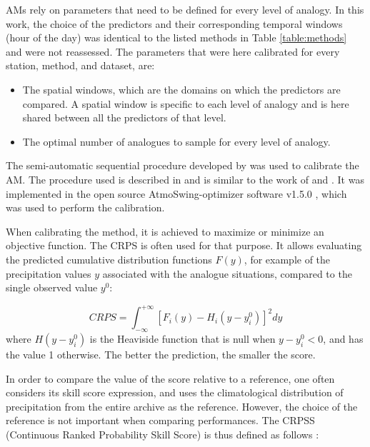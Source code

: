 \documentclass{ametsoc}
\begin{document}
AMs rely on parameters that need to be defined for every level of analogy. In this work, the choice of the predictors and their corresponding temporal windows (hour of the day) was identical to the listed methods in Table \ref{table:methods} and were not reassessed. The parameters that were here calibrated for every station, method, and dataset, are:

\begin{itemize}
	\item The spatial windows, which are the domains on which the predictors are compared. A spatial window is specific to each level of analogy and is here shared between all the predictors of that level.
	\item The optimal number of analogues to sample for every level of analogy.
\end{itemize}

The semi-automatic sequential procedure developed by \citet{Bontron2004} was used to calibrate the AM. The procedure used is described in \citet{Horton2017c} and is similar to the work of \citet{Radanovics2013} and \citet{BenDaoud2016}. It was implemented in the open source AtmoSwing-optimizer software v1.5.0 \citep[www.atmoswing.org,][]{Horton2017a}, which was used to perform the calibration.

When calibrating the method, it is achieved to maximize or minimize an objective function. The CRPS \citep[Continuous Ranked Probability Score,][]{Brown1974, Matheson1976, Hersbach2000} is often used for that purpose. It allows evaluating the predicted cumulative distribution functions $F(y)$, for example of the precipitation values $y$ associated with the analogue situations, compared to the single observed value $y^{0}$:

\begin{equation}
\label{eq:CRPS}
CRPS = \int_{-\infty}^{+\infty} \left[ F_{i}(y)-H_{i}(y-y_{i}^{0})\right]^{2} dy
\end{equation}
where $H(y-y_{i}^{0})$ is the Heaviside function that is null when $y-y_{i}^{0}<0$, and has the value 1 otherwise. The better the prediction, the smaller the score.

In order to compare the value of the score relative to a reference, one often considers its skill score expression, and uses the climatological distribution of precipitation from the entire archive as the reference. However, the choice of the reference is not important when comparing performances. The CRPSS (Continuous Ranked Probability Skill Score) is thus defined as follows \citep{Bradley2011}:
\end{document}
